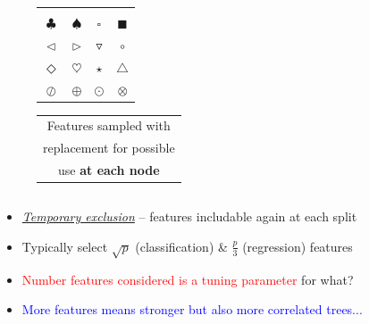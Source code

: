 \documentclass[xcolor={dvipsnames}]{beamer}
\begin{document}
{\begin{columns}
\begin{column}{.5\textwidth}
\begin{figure}
\begin{tabular}{|cccc|}
&&&\\
$\clubsuit$ & $\spadesuit$ & $\square$ & $\blacksquare$\\
 $\triangleleft$ & $\triangleright$ & $\triangledown$ & $\circ$\\
 $\Diamond$ & $\heartsuit$ & $\star$ & $\triangle$ \\
 $\oslash$ & $\oplus$ & $\odot$ & $\otimes$  \\ \hline
\end{tabular}
\begin{tabular}{c}
Features sampled with \\
replacement for possible \\
 use \textbf{at each node}  \\
\end{tabular}
\end{figure}
\end{column}
\end{columns}

\begin{itemize}
\item<5->  \underline{\emph{Temporary exclusion}} -- features includable again at each split
\item<6-> Typically select $\sqrt{p}$ (classification) \& $\frac{p}{3}$ (regression) features
\item<7->[] \textcolor{red}{Number features considered is a tuning parameter} for what?
\item<8-> \textcolor{blue}{More features  means stronger but also more correlated trees...} 
\end{itemize}

}
\end{document}
